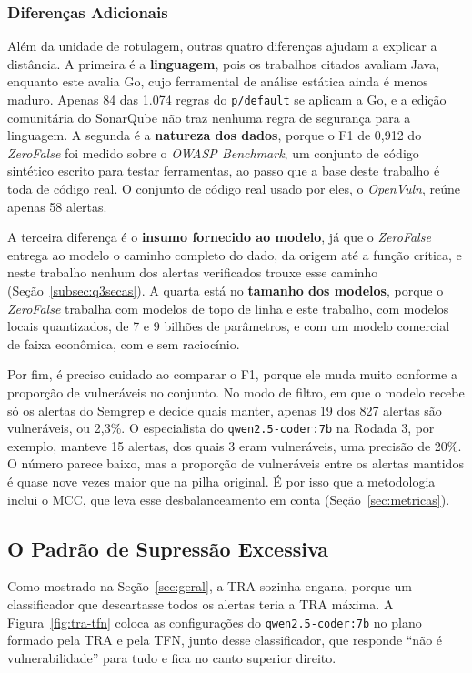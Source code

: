 \subsubsection{Diferenças Adicionais}

Além da unidade de rotulagem, outras quatro diferenças ajudam a explicar a distância. A primeira é a \textbf{linguagem}, pois os trabalhos citados avaliam Java, enquanto este avalia Go, cujo ferramental de análise estática ainda é menos maduro. Apenas 84 das 1.074 regras do \texttt{p/default} se aplicam a Go, e a edição comunitária do SonarQube não traz nenhuma regra de segurança para a linguagem. A segunda é a \textbf{natureza dos dados}, porque o F1 de 0,912 do \textit{ZeroFalse} foi medido sobre o \textit{OWASP Benchmark}, um conjunto de código sintético escrito para testar ferramentas, ao passo que a base deste trabalho é toda de código real. O conjunto de código real usado por eles, o \textit{OpenVuln}, reúne apenas 58 alertas.

A terceira diferença é o \textbf{insumo fornecido ao modelo}, já que o \textit{ZeroFalse} entrega ao modelo o caminho completo do dado, da origem até a função crítica, e neste trabalho nenhum dos alertas verificados trouxe esse caminho (Seção~\ref{subsec:q3secas}). A quarta está no \textbf{tamanho dos modelos}, porque o \textit{ZeroFalse} trabalha com modelos de topo de linha e este trabalho, com modelos locais quantizados, de 7 e 9 bilhões de parâmetros, e com um modelo comercial de faixa econômica, com e sem raciocínio.

Por fim, é preciso cuidado ao comparar o F1, porque ele muda muito conforme a proporção de vulneráveis no conjunto. No modo de filtro, em que o modelo recebe só os alertas do Semgrep e decide quais manter, apenas 19 dos 827 alertas são vulneráveis, ou 2,3\%. O especialista do \texttt{qwen2.5-coder:7b} na Rodada 3, por exemplo, manteve 15 alertas, dos quais 3 eram vulneráveis, uma precisão de 20\%. O número parece baixo, mas a proporção de vulneráveis entre os alertas mantidos é quase nove vezes maior que na pilha original. É por isso que a metodologia inclui o MCC, que leva esse desbalanceamento em conta (Seção~\ref{sec:metricas}).

\subsection{O Padrão de Supressão Excessiva}
\label{subsec:supressao}

Como mostrado na Seção~\ref{sec:geral}, a TRA sozinha engana, porque um classificador que descartasse todos os alertas teria a TRA máxima. A Figura~\ref{fig:tra-tfn} coloca as configurações do \texttt{qwen2.5-coder:7b} no plano formado pela TRA e pela TFN, junto desse classificador, que responde ``não é vulnerabilidade'' para tudo e fica no canto superior direito.

